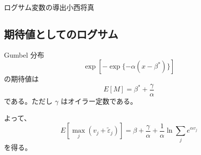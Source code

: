 \begin{column}{ログサム変数の導出}{小西将真}
\subsection{期待値としてのログサム}

Gumbel 分布
\[
\exp\left[
-\exp\{-\alpha(x - \beta^\ast)\}
\right]
\]
の期待値は
\[
E[M] = \beta^\ast + \frac{\gamma}{\alpha}
\]
である。ただし $\gamma$ はオイラー定数である。

よって、
\[
E\left[\max_j (v_j + \tilde{\varepsilon}_j)\right]
=
\beta + \frac{\gamma}{\alpha}
+
\frac{1}{\alpha} \ln \sum_j e^{\alpha v_j}
\]
を得る。

\end{column}
\clearpage
